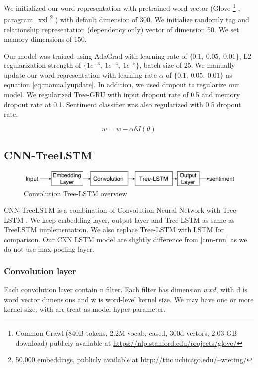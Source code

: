 We initialized our word representation with pretrained word vector (Glove \footnote{Common Crawl (840B tokens, 2.2M vocab, cased, 300d vectors, 2.03 GB download) publicly available at \url{https://nlp.stanford.edu/projects/glove/}} \cite{glove}, paragram\_xxl \footnote{50,000 embeddings, publicly available at \url{http://ttic.uchicago.edu/~wieting/}} \cite{wieting2015towards}) with default dimension of 300.  We initialize randomly tag and relationship representation (dependency only) vector of dimension 50. We set memory dimensions of 150. 

Our model was trained using AdaGrad \cite{duchi2011adaptive} with learning rate of $\{0.1,~ 0.05,~ 0.01\}$, L2 regularization strength of $\{1e^{-3},~ 1e^{-4}, ~ 1e^{-5} \}$, batch size of 25. We manually update our word representation with learning rate $\alpha$ of $\{0.1,~0.05, ~0.01\}$ as equation \ref{eq:manuallyupdate}. In addition, we used dropout \cite{krizhevsky2012imagenet} to regularize our model. We regularized Tree-GRU with input dropout rate of 0.5 and memory dropout rate at 0.1. Sentiment classifier was also regularized with 0.5 dropout rate. 


\begin{equation}
\label{eq:manuallyupdate}
w = w - \alpha\delta J(\theta)
\end{equation}


\subsection{CNN-TreeLSTM}\label{sec:CNNtree}

\begin{figure}[H]
	\centering
	\includegraphics[width=0.8\linewidth]{figure/convtreelstmsummary}
	\caption[Convolution Tree-LSTM overview]{Convolution Tree-LSTM overview}
	\label{fig:convtreelstmsummary}
\end{figure}

CNN-TreeLSTM is a combination of Convolution Neural Network with Tree-LSTM \cite{treeLSTM}. We keep embedding layer, output layer and Tree-LSTM as same as TreeLSTM implementation. We also replace Tree-LSTM with LSTM for comparison. Our CNN LSTM model are slightly difference from \ref{cnn-rnn} as we do not use max-pooling layer.

\subsubsection{Convolution layer}
Each convolution layer contain n filter. Each filter has dimension $w x d$, with d is word vector dimensions and w is word-level kernel size. We may have one or more kernel size, with are treat as model hyper-parameter. 

